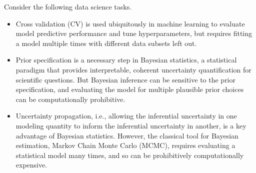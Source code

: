 Consider the following data science tasks.
%
\begin{itemize}
%
        \item Cross validation (CV) is used ubiquitously in machine learning to
        evaluate model predictive performance and tune hyperparameters, but
        requires fitting a model multiple times with different data subsets left
        out.
        \item  Prior specification is a necessary step in Bayesian statistics, a
        statistical paradigm that provides interpretable, coherent uncertainty
        quantification for scientific questions.  But Bayesian inference can be
        sensitive to the prior specification, and evaluating the model for
        multiple plausible prior choices can be computationally prohibitive.
        \item Uncertainty propagation, i.e., allowing the inferential
        uncertainty in one modeling quantity to inform the inferential
        uncertainty in another, is a key advantage of Bayesian statistics.
        However, the classical tool for Bayesian estimation, Markov Chain Monte
        Carlo (MCMC), requires evaluating a statistical model many times, and so
        can be prohibitively computationally expensive.
%
\end{itemize}
%


